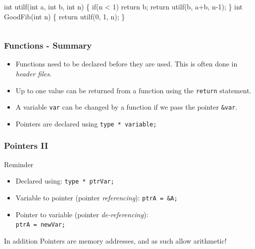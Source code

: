 \documentclass[table]{beamer}
\newif\ifschigh\schighfalse
\newcommand{\kw}[1]{\ifschigh\textcolor{red}{#1}\else\textcolor{keyword}{#1}\fi}
\begin{document}
\begin{frame}[fragile]
\begin{columns}
\begin{column}{7cm}
\begin{exampleblock}{}
\begin{semiverbatim}
\kw{int} utilf(\kw{int} a, \kw{int} b, \kw{int} n)
\{
   \kw{if}(n < 1) \kw{return} b;
   \kw{return} utilf(b, a+b, n-1);
\}
\kw{int} GoodFib(\kw{int} n)
\{
   \kw{return} utilf(0, 1, n);
\}
\end{semiverbatim}
\end{exampleblock}
\end{column}
\begin{column}{3cm}
\end{column}
\end{columns}
\end{frame}

\begin{frame}
\frametitle{Functions - Summary}
\begin{itemize}
\item Functions need to be declared before they are used. This is often done in \emph{header files}.
\item Up to one value can be returned from a function using the \kw{\tt return} statement.
\item A variable {\tt var} can be changed by a function if we pass the pointer
{\tt \&var}.
\item Pointers are declared using {\tt type * variable;}
\end{itemize}
\end{frame}

{
\begin{frame}
\frametitle{Pointers II}
\begin{block}{Reminder}
\begin{itemize}
\item Declared using: {\tt type * ptrVar;}
\item Variable to pointer (pointer \emph{referencing}): {\tt ptrA = \&A;}
\item Pointer to variable (pointer \emph{de-referencing}):\\ {\tt *ptrA = newVar;}
\end{itemize}
\end{block}

\begin{exampleblock}{In addition}
Pointers are memory addresses, and as such allow arithmetic!
\end{exampleblock}
\end{frame}
}
\end{document}
